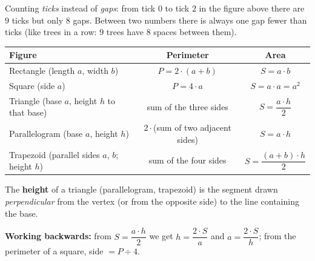 \begin{warnbox}
Counting \emph{ticks} instead of \emph{gaps}: from tick $0$ to tick $2$ in the figure above there are $9$ ticks but only $8$ gaps. Between two numbers there is always one gap fewer than ticks (like trees in a row: $9$ trees have $8$ spaces between them).
\end{warnbox}

\begin{knowbox}
\begin{center}
\renewcommand{\arraystretch}{1.5}
\begin{tabular}{|l|c|c|}
\hline
\textbf{Figure} & \textbf{Perimeter} & \textbf{Area} \\ \hline
Rectangle (length $a$, width $b$) & $P=2\cdot(a+b)$ & $S=a\cdot b$ \\ \hline
Square (side $a$) & $P=4\cdot a$ & $S=a\cdot a=a^2$ \\ \hline
Triangle (base $a$, height $h$ to that base) & sum of the three sides & $S=\dfrac{a\cdot h}{2}$ \\ \hline
Parallelogram (base $a$, height $h$) & $2\cdot$(sum of two adjacent sides) & $S=a\cdot h$ \\ \hline
Trapezoid (parallel sides $a$, $b$; height $h$) & sum of the four sides & $S=\dfrac{(a+b)\cdot h}{2}$ \\ \hline
\end{tabular}
\end{center}
The \textbf{height} of a triangle (parallelogram, trapezoid) is the segment drawn \emph{perpendicular} from the vertex (or from the opposite side) to the line containing the base.

\textbf{Working backwards:} from $S=\dfrac{a\cdot h}{2}$ we get $h=\dfrac{2\cdot S}{a}$ and $a=\dfrac{2\cdot S}{h}$; from the perimeter of a square, side $=P\div4$.
\end{knowbox}

